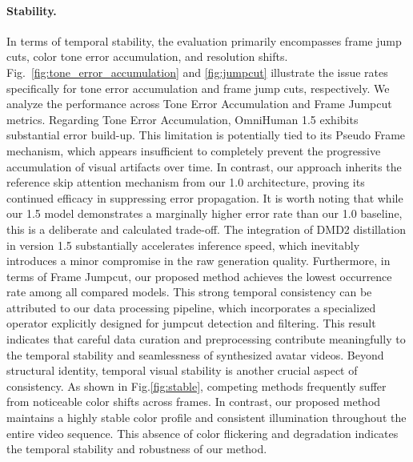 \paragraph{Stability.}
In terms of temporal stability, the evaluation primarily encompasses frame jump cuts, color tone error accumulation, and resolution shifts. Fig.~\ref{fig:tone_error_accumulation} and \ref{fig:jumpcut} illustrate the issue rates specifically for tone error accumulation and frame jump cuts, respectively. We analyze the performance across Tone Error Accumulation and Frame Jumpcut metrics. Regarding Tone Error Accumulation, OmniHuman 1.5 exhibits substantial error build-up. This limitation is potentially tied to its Pseudo Frame mechanism, which appears insufficient to completely prevent the progressive accumulation of visual artifacts over time. In contrast, our approach inherits the reference skip attention mechanism from our 1.0 architecture, proving its continued efficacy in suppressing error propagation. It is worth noting that while our 1.5 model demonstrates a marginally higher error rate than our 1.0 baseline, this is a deliberate and calculated trade-off. The integration of DMD2 distillation in version 1.5 substantially accelerates inference speed, which inevitably introduces a minor compromise in the raw generation quality. Furthermore, in terms of Frame Jumpcut, our proposed method achieves the lowest occurrence rate among all compared models. This strong temporal consistency can be attributed to our data processing pipeline, which incorporates a specialized operator explicitly designed for jumpcut detection and filtering. This result indicates that careful data curation and preprocessing contribute meaningfully to the temporal stability and seamlessness of synthesized avatar videos.
Beyond structural identity, temporal visual stability is another crucial aspect of consistency. As shown in Fig.\ref{fig:stable}, competing methods frequently suffer from noticeable color shifts across frames. In contrast, our proposed method maintains a highly stable color profile and consistent illumination throughout the entire video sequence. This absence of color flickering and degradation indicates the temporal stability and robustness of our method.





